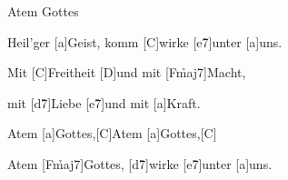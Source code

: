 \begin{song}{Atem Gottes} 

Heil'ger [a]Geist, komm [C]wirke [e\h7]unter [a]uns.

Mit [C]Freitheit [D]und mit [F\h{maj7}]Macht, 

mit [d\h 7]Liebe [e\h7]und mit [a]Kraft.

\begin{chorus}
Atem [a]Gottes,[C]\quad [e\h7]\quad   Atem [a]Gottes,[C]\quad [D]\quad 

Atem [F\h{maj7}]Gottes, [d\h7]wirke [e\h7]unter [a]uns.
\end{chorus}
\end{song}


